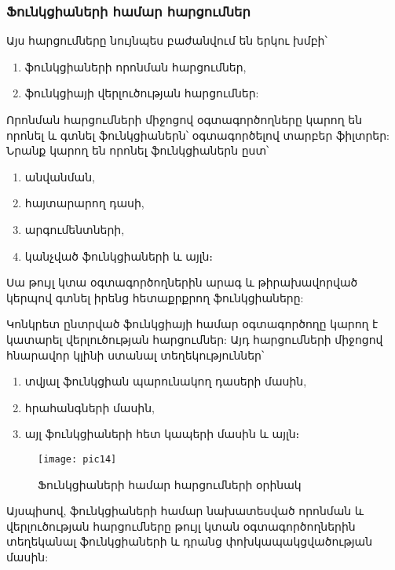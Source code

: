 \subsubsection*{Ֆունկցիաների համար հարցումներ}\label{subsubsec:functions}

Այս հարցումները նույնպես բաժանվում են երկու խմբի՝
\begin{enumerate}
    \item ֆունկցիաների որոնման հարցումներ,
    \item ֆունկցիայի վերլուծության հարցումներ:
\end{enumerate}

Որոնման հարցումների միջոցով օգտագործողները կարող են որոնել և գտնել ֆունկցիաներն՝ օգտագործելով տարբեր ֆիլտրեր:
Նրանք կարող են որոնել ֆունկցիաներն ըստ՝
\begin{enumerate}
    \item անվանման,
    \item հայտարարող դասի,
    \item արգումենտների,
    \item կանչված ֆունկցիաների և այլն։
\end{enumerate}

Սա թույլ կտա օգտագործողներին արագ և թիրախավորված կերպով գտնել իրենց հետաքրքրող ֆունկցիաները:

Կոնկրետ ընտրված ֆունկցիայի համար օգտագործողը կարող է կատարել վերլուծության հարցումներ: Այդ հարցումների միջոցով հնարավոր
կլինի ստանալ տեղեկություններ՝
\begin{enumerate}
    \item տվյալ ֆունկցիան պարունակող դասերի մասին,
    \item հրահանգների մասին,
    \item այլ ֆունկցիաների հետ կապերի մասին և այլն։
\end{enumerate}

\begin{figure}[h]
    \centering
    \texttt{[image: pic14]}
    \caption{Ֆունկցիաների համար հարցումների օրինակ}
    \label{fig:figure14}
\end{figure}

Այսպիսով, ֆունկցիաների համար նախատեսված որոնման և վերլուծության հարցումները թույլ կտան օգտագործողներին տեղեկանալ ֆունկցիաների
և դրանց փոխկապակցվածության մասին:
